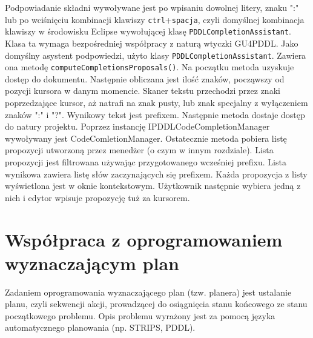 Podpowiadanie składni wywoływane jest po wpisaniu dowolnej litery, znaku ":" lub po wciśnięciu kombinacji klawiszy \texttt{ctrl}+\texttt{spacja}, czyli domyślnej kombinacja klawiszy w środowisku Eclipse wywołującej klasę \texttt{PDDLCompletionAssistant}. Klasa ta wymaga bezpośredniej współpracy z naturą wtyczki GU4PDDL. Jako domyślny asystent podpowiedzi, użyto klasy \texttt{PDDLCompletionAssistant}. Zawiera ona metodę \texttt{computeCompletionsProposals()}. Na początku metoda uzyskuje dostęp do dokumentu. Następnie obliczana jest ilość znaków, począwszy od pozycji kursora w danym momencie. Skaner tekstu przechodzi przez znaki poprzedzające kursor, aż natrafi na znak pusty, lub znak specjalny z wyłączeniem znaków ":" i "?". Wynikowy tekst jest prefixem. Następnie metoda dostaje dostęp do natury projektu. Poprzez instancję  IPDDLCodeCompletionManager wywoływany jest CodeComletionManager. Ostatecznie metoda pobiera listę propozycji utworzoną przez menedżer (o czym w innym rozdziale). Lista propozycji jest filtrowana używając przygotowanego wcześniej prefixu. Lista wynikowa zawiera listę słów zaczynających się prefixem. Każda propozycja z listy wyświetlona jest w oknie kontekstowym. Użytkownik następnie wybiera jedną z nich i edytor wpisuje propozycję tuż za kursorem.




\section{Współpraca z oprogramowaniem wyznaczającym plan}
\label{sec:wspolpraca}
Zadaniem oprogramowania wyznaczającego plan (tzw. planera) jest ustalanie planu, czyli sekwencji akcji,  prowadzącej do osiągnięcia stanu końcowego ze stanu początkowego problemu. Opis problemu wyrażony jest za pomocą języka automatycznego planowania (np. STRIPS, PDDL). 

